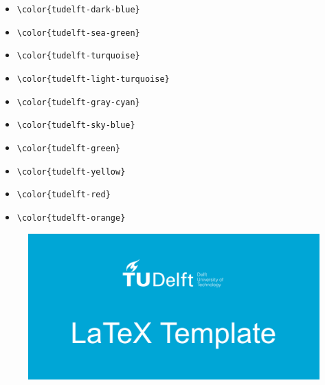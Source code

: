 \begin{itemize}
    \item {\color{tudelft-dark-blue}\verb|\color{tudelft-dark-blue}|}
    \item {\color{tudelft-sea-green}\verb|\color{tudelft-sea-green}|}
    \item {\color{tudelft-turquoise}\verb|\color{tudelft-turquoise}|}
    \item {\color{tudelft-light-turquoise}\verb|\color{tudelft-light-turquoise}|}
    \item {\color{tudelft-gray-cyan}\verb|\color{tudelft-gray-cyan}|}
    \item {\color{tudelft-sky-blue}\verb|\color{tudelft-sky-blue}|}
    \item {\color{tudelft-green}\verb|\color{tudelft-green}|}
    \item {\color{tudelft-yellow}\verb|\color{tudelft-yellow}|}
    \item {\color{tudelft-red}\verb|\color{tudelft-red}|}
    \item {\color{tudelft-orange}\verb|\color{tudelft-orange}|}
\end{itemize}


\begin{figure}[H]
    \includegraphics[width=\textwidth]{design/GitHub_repo_card.png}
\end{figure}
